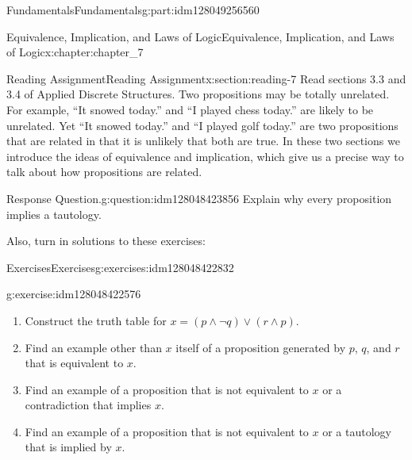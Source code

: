 \documentclass[oneside,10pt,]{book}
\numberwithin{equation}{section}
\begin{document}
\begin{partptx}{Fundamentals}{}{Fundamentals}{}{}{g:part:idm128049256560}
\typeout{************************************************}
%
\begin{chapterptx}{Equivalence, Implication, and Laws of Logic}{}{Equivalence, Implication, and Laws of Logic}{}{}{x:chapter:chapter_7}
%
%
%
%
%
\typeout{************************************************}
\typeout{************************************************}
%
\begin{sectionptx}{Reading Assignment}{}{Reading Assignment}{}{}{x:section:reading-7}
Read sections 3.3 and 3.4 of Applied Discrete Structures. Two propositions may be totally unrelated.  For example, ``It snowed today.'' and ``I played chess today.'' are likely to be unrelated.  Yet ``It snowed today.'' and ``I played golf today.'' are two propositions that are related in that it is unlikely that both are true.  In these two sections we introduce the ideas of equivalence and implication, which give us a precise way to talk about how propositions are related.%
\begin{question}{Response Question.}{g:question:idm128048423856}%
Explain why every proposition implies a tautology.%
\end{question}
Also, turn in solutions to these exercises:%
%
%
\typeout{************************************************}
\typeout{************************************************}
%
\begin{exercises-subsection}{Exercises}{}{Exercises}{}{}{g:exercises:idm128048422832}
\par\medskip\noindent%
%
\begin{exercisegroup}
\begin{divisionexerciseeg}{1}{}{}{g:exercise:idm128048422576}%
%
\begin{enumerate}[label=(\alph*)]
\item{}Construct the truth table for \(x= (p \land  \neg q) \lor  (r \land  p)\).%
\item{}Find an example other than \(x\) itself of a proposition generated by \(p\), \(q\), and \(r\) that is equivalent to \(x\).%
\item{}Find an example of a proposition that is not equivalent to \(x\) or a contradiction  that implies \(x\).%
\item{}Find an example of a proposition that is not equivalent to \(x\) or a tautology that is implied by \(x\).%
\end{enumerate}
%
\end{divisionexerciseeg}%

\end{exercisegroup}
\end{exercises-subsection}
\end{sectionptx}
\end{chapterptx}
\end{partptx}
\end{document}
